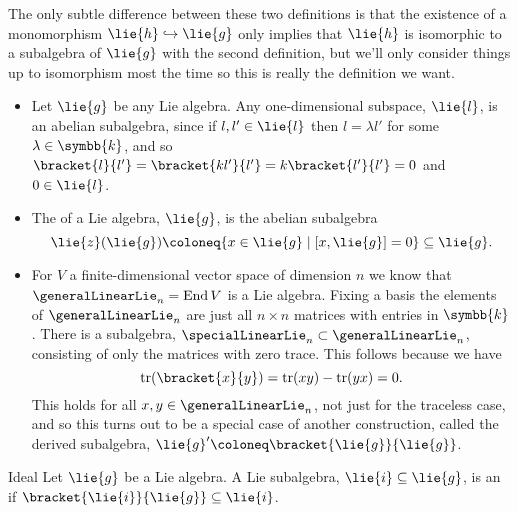 \documentclass[fleqn]{NotesClass}
\renewcommand{\field}{\symbb{k}}
\DeclareMathOperator{\End}{End}
\DeclareMathOperator{\tr}{tr}
\begin{document}
    The only subtle difference between these two definitions is that the existence of a monomorphism \(\lie{h} \hookrightarrow \lie{g}\) only implies that \(\lie{h}\) is isomorphic to a subalgebra of \(\lie{g}\) with the second definition, but we'll only consider things up to isomorphism most the time so this is really the definition we want.
    
    \begin{exm}{}{}
        \begin{itemize}
            \item Let \(\lie{g}\) be any Lie algebra.
            Any one-dimensional subspace, \(\lie{l}\), is an abelian subalgebra, since if \(l, l' \in \lie{l}\) then \(l = \lambda l'\) for some \(\lambda \in \field\), and so \(\bracket{l}{l'} = \bracket{kl'}{l'} = k\bracket{l'}{l'} = 0\) and \(0 \in \lie{l}\).
            \item The  of a Lie algebra, \(\lie{g}\), is the abelian subalgebra
            \begin{equation}
                \lie{z}(\lie{g}) \coloneq \{x \in \lie{g} \mid [x, \lie{g}] = 0\} \subseteq \lie{g}.
            \end{equation}
            \item For \(V\) a finite-dimensional vector space of dimension \(n\) we know that \(\generalLinearLie_n = \End V\) is a Lie algebra.
            Fixing a basis the elements of \(\generalLinearLie_n\) are just all \(n \times n\) matrices with entries in \(\field\).
            There is a subalgebra, \(\specialLinearLie_n \subset \generalLinearLie_n\), consisting of only the matrices with zero trace.
            This follows because we have
            \begin{equation}
                \tr(\bracket{x}{y}) = \tr(xy) - \tr(yx) = 0.
            \end{equation}
            This holds for all \(x, y \in \generalLinearLie_n\), not just for the traceless case, and so this turns out to be a special case of another construction, called the derived subalgebra, \(\lie{g}' \coloneq \bracket{\lie{g}}{\lie{g}}\).
        \end{itemize}
    \end{exm}
    
    \begin{dfn}{Ideal}{}
        Let \(\lie{g}\) be a Lie algebra.
        A Lie subalgebra, \(\lie{i} \subseteq \lie{g}\), is an  if \(\bracket{\lie{i}}{\lie{g}} \subseteq \lie{i}\).
    \end{dfn}
    
\end{document}
